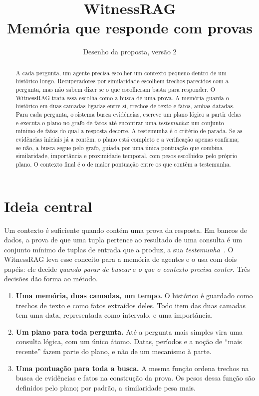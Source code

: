 \documentclass[11pt]{article}
\title{\textbf{WitnessRAG}\\[4pt]
\large Memória que responde com provas}
\author{}
\date{Desenho da proposta, versão 2}
\theoremstyle{definition}
\theoremstyle{plain}
\begin{document}
\maketitle

\begin{abstract}
\noindent
A cada pergunta, um agente precisa escolher um contexto pequeno dentro de um
histórico longo. Recuperadores por similaridade escolhem trechos parecidos com
a pergunta, mas não sabem dizer se o que escolheram basta para responder. O
WitnessRAG trata essa escolha como a busca de uma prova. A memória guarda o
histórico em duas camadas ligadas entre si, trechos de texto e fatos, ambas
datadas. Para cada pergunta, o sistema busca evidências, escreve um plano
lógico a partir delas e executa o plano no grafo de fatos até encontrar uma
\emph{testemunha}: um conjunto mínimo de fatos do qual a resposta decorre. A
testemunha é o critério de parada. Se as evidências iniciais já a contêm, o
plano está completo e a verificação apenas confirma; se não, a busca segue
pelo grafo, guiada por uma única pontuação que combina similaridade,
importância e proximidade temporal, com pesos escolhidos pelo próprio plano.
O contexto final é o de maior pontuação entre os que contêm a testemunha.
\end{abstract}

\section{Ideia central}

Um contexto é suficiente quando contém uma prova da resposta. Em bancos de
dados, a prova de que uma tupla pertence ao resultado de uma consulta é um
conjunto mínimo de tuplas de entrada que a produz, a sua
\emph{testemunha}~\citep{buneman2001why,green2007provenance}. O WitnessRAG
leva esse conceito para a memória de agentes e o usa com dois papéis: ele
decide \emph{quando parar de buscar} e \emph{o que o contexto precisa conter}.
Três decisões dão forma ao método.

\begin{enumerate}[leftmargin=*,itemsep=2pt]
\item \textbf{Uma memória, duas camadas, um tempo.} O histórico é guardado
  como trechos de texto e como fatos extraídos deles. Todo item das duas
  camadas tem uma data, representada como intervalo, e uma importância.
\item \textbf{Um plano para toda pergunta.} Até a pergunta mais simples vira
  uma consulta lógica, com um único átomo. Datas, períodos e a noção de
  ``mais recente'' fazem parte do plano, e não de um mecanismo à parte.
\item \textbf{Uma pontuação para toda a busca.} A mesma função ordena trechos
  na busca de evidências e fatos na construção da prova. Os pesos dessa
  função são definidos pelo plano; por padrão, a similaridade pesa mais.
\end{enumerate}
\end{document}
